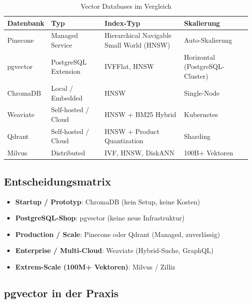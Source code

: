 \begin{table}[H]
\centering
\begin{tabularx}{\linewidth}{lXXX}
\toprule
\textbf{Datenbank} & \textbf{Typ} & \textbf{Index-Typ} & \textbf{Skalierung} \\
\midrule
Pinecone & Managed Service & Hierarchical Navigable Small World (HNSW) & Auto-Skalierung \\
pgvector & PostgreSQL Extension & IVFFlat, HNSW & Horizontal (PostgreSQL-Cluster) \\
ChromaDB & Local / Embedded & HNSW & Single-Node \\
Weaviate & Self-hosted / Cloud & HNSW + BM25 Hybrid & Kubernetes \\
Qdrant & Self-hosted / Cloud & HNSW + Product Quantization & Sharding \\
Milvus & Distributed & IVF, HNSW, DiskANN & 100B+ Vektoren \\
\midrule
\end{tabularx}
\caption{Vector Databases im Vergleich}
\label{tab:vectordbs}
\end{table}

\subsection{Entscheidungsmatrix}

\begin{itemize}[leftmargin=*]
    \item \textbf{Startup / Prototyp}: ChromaDB (kein Setup, keine Kosten)
    \item \textbf{PostgreSQL-Shop}: pgvector (keine neue Infrastruktur)
    \item \textbf{Production / Scale}: Pinecone oder Qdrant (Managed, zuverlässig)
    \item \textbf{Enterprise / Multi-Cloud}: Weaviate (Hybrid-Suche, GraphQL)
    \item \textbf{Extrem-Scale (100M+ Vektoren)}: Milvus / Zilliz
\end{itemize}

\subsection{pgvector in der Praxis}

